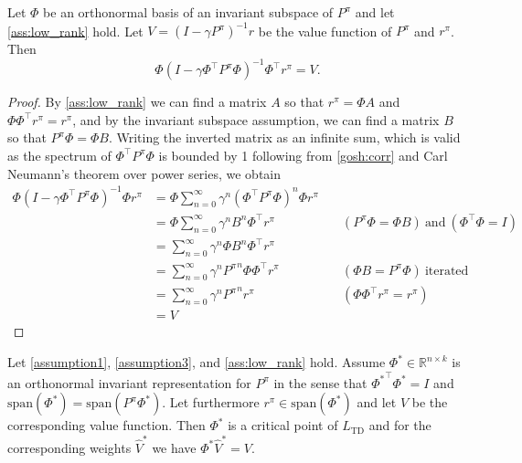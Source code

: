 \begin{lemma}\label{lem:lossless_approx}
    Let $\Phi$ be an orthonormal basis of an invariant subspace of $P^\pi$ and let \autoref{ass:low_rank} hold. Let $V = (I - \gamma P^\pi)^{-1} r$ be the value function of $P^\pi$ and $r^\pi$. Then $$\Phi (I - \gamma \Phi^\top P^\pi \Phi)^{-1} \Phi^\top r^\pi = V.$$
\end{lemma}
\begin{proof}
    By \autoref{ass:low_rank} we can find a matrix $A$ so that $r^\pi = \Phi A$ and $\Phi\Phi^\top r^\pi = r^\pi$, and by the invariant subspace assumption, we can find a matrix $B$ so that $P^\pi \Phi = \Phi B$.
    Writing the inverted matrix as an infinite sum, which is valid as the spectrum of $\Phi^\top P^\pi \Phi$ is bounded by 1 following from \autoref{gosh:corr} and Carl Neumann's theorem over power series, we obtain
    \begin{align*}
        \Phi (I - \gamma \Phi^\top P^\pi \Phi)^{-1} \Phi r^\pi &= \Phi \sum_{n=0}^\infty \gamma^n (\Phi^\top P^\pi \Phi)^n \Phi r^\pi \\
        &= \Phi \sum_{n=0}^\infty \gamma^n B^n \Phi^\top r^\pi &\quad (P^\pi \Phi = \Phi B)~\text{and}~(\Phi^\top \Phi = I)\\
        &= \sum_{n=0}^\infty \gamma^n \Phi B^n \Phi^\top r^\pi \\
        &= \sum_{n=0}^\infty \gamma^n {P^\pi}^n \Phi\Phi^\top r^\pi &\quad (\Phi B = P^\pi \Phi)~\text{iterated} \\
        &= \sum_{n=0}^\infty \gamma^n {P^\pi}^n r^\pi &\quad (\Phi\Phi^\top r^\pi = r^\pi) \\
        &= V
    \end{align*}
\end{proof}


\begin{lemma}\label{prop:td_critical}
Let \autoref{assumption1}, \autoref{assumption3}, and \autoref{ass:low_rank} hold.
    Assume $\Phi^* \in \mathbb{R}^{n \times k}$ is an orthonormal invariant representation for $P^\pi$ in the sense that ${\Phi^*}^\top \Phi^* = I$ and $\text{span}(\Phi^*) = \text{span}(P^\pi \Phi^*)$. Let furthermore  $r^\pi \in \text{span}(\Phi^*)$ and let $V$ be the corresponding value function. Then $\Phi^*$ is a critical point of $L_\text{TD}$ and for the corresponding weights $\hat{V}^*$ we have $\Phi^*\hat{V}^* = V$.
\end{lemma}

